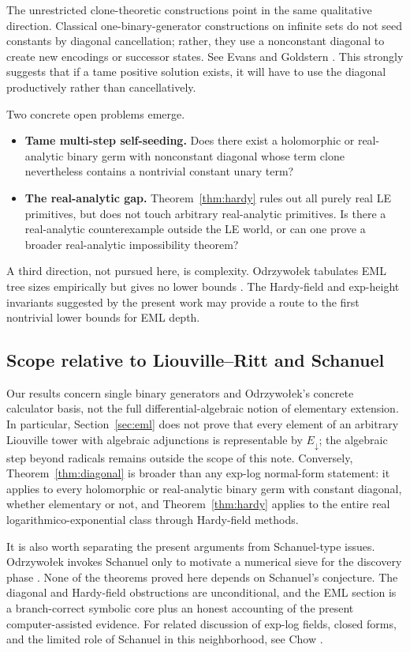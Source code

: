 \documentclass[12pt]{amsart}
\theoremstyle{remark}
\newcommand{\Edown}{E_{\downarrow}}
\begin{document}
The unrestricted clone-theoretic constructions point in the same qualitative direction.  Classical one-binary-generator constructions on infinite sets do not seed constants by diagonal cancellation; rather, they use a nonconstant diagonal to create new encodings or successor states.  See Evans and Goldstern \cite{Evans1989,Goldstern2010}.  This strongly suggests that if a tame positive solution exists, it will have to use the diagonal productively rather than cancellatively.

Two concrete open problems emerge.
\begin{itemize}
    \item \textbf{Tame multi-step self-seeding.}  Does there exist a holomorphic or real-analytic binary germ with nonconstant diagonal whose term clone nevertheless contains a nontrivial constant unary term?
    \item \textbf{The real-analytic gap.}  Theorem~\ref{thm:hardy} rules out all purely real LE primitives, but does not touch arbitrary real-analytic primitives.  Is there a real-analytic counterexample outside the LE world, or can one prove a broader real-analytic impossibility theorem?
\end{itemize}
A third direction, not pursued here, is complexity.  Odrzywo\l{}ek tabulates EML tree sizes empirically but gives no lower bounds \cite{Odrzywolek2026}.  The Hardy-field and exp-height invariants suggested by the present work may provide a route to the first nontrivial lower bounds for EML depth.

\subsection*{Scope relative to Liouville--Ritt and Schanuel}
Our results concern single binary generators and Odrzywo\l{}ek's concrete calculator basis, not the full differential-algebraic notion of elementary extension.  In particular, Section~\ref{sec:eml} does not prove that every element of an arbitrary Liouville tower with algebraic adjunctions is representable by $\Edown$; the algebraic step beyond radicals remains outside the scope of this note.  Conversely, Theorem~\ref{thm:diagonal} is broader than any exp-log normal-form statement: it applies to every holomorphic or real-analytic binary germ with constant diagonal, whether elementary or not, and Theorem~\ref{thm:hardy} applies to the entire real logarithmico-exponential class through Hardy-field methods.

It is also worth separating the present arguments from Schanuel-type issues.  Odrzywo\l{}ek invokes Schanuel only to motivate a numerical sieve for the discovery phase \cite{Odrzywolek2026}.  None of the theorems proved here depends on Schanuel's conjecture.  The diagonal and Hardy-field obstructions are unconditional, and the EML section is a branch-correct symbolic core plus an honest accounting of the present computer-assisted evidence.  For related discussion of exp-log fields, closed forms, and the limited role of Schanuel in this neighborhood, see Chow \cite{Chow1999}.
\end{document}

